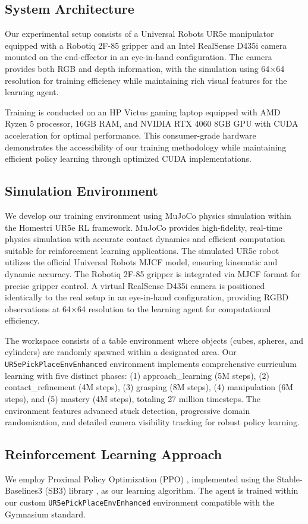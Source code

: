 \documentclass[conference]{IEEEtran}
\begin{document}
\subsection{System Architecture}
Our experimental setup consists of a Universal Robots UR5e manipulator equipped with a Robotiq 2F-85 gripper and an Intel RealSense D435i camera mounted on the end-effector in an eye-in-hand configuration. The camera provides both RGB and depth information, with the simulation using 64$\times$64 resolution for training efficiency while maintaining rich visual features for the learning agent. 

Training is conducted on an HP Victus gaming laptop equipped with AMD Ryzen 5 processor, 16GB RAM, and NVIDIA RTX 4060 8GB GPU with CUDA acceleration for optimal performance. This consumer-grade hardware demonstrates the accessibility of our training methodology while maintaining efficient policy learning through optimized CUDA implementations.

\subsection{Simulation Environment}
We develop our training environment using MuJoCo physics simulation within the Homestri UR5e RL framework. MuJoCo provides high-fidelity, real-time physics simulation with accurate contact dynamics and efficient computation suitable for reinforcement learning applications. The simulated UR5e robot utilizes the official Universal Robots MJCF model, ensuring kinematic and dynamic accuracy. The Robotiq 2F-85 gripper is integrated via MJCF format for precise gripper control. A virtual RealSense D435i camera is positioned identically to the real setup in an eye-in-hand configuration, providing RGBD observations at 64$\times$64 resolution to the learning agent for computational efficiency.

The workspace consists of a table environment where objects (cubes, spheres, and cylinders) are randomly spawned within a designated area. Our \texttt{UR5ePickPlaceEnvEnhanced} environment implements comprehensive curriculum learning with five distinct phases: (1) approach\_learning (5M steps), (2) contact\_refinement (4M steps), (3) grasping (8M steps), (4) manipulation (6M steps), and (5) mastery (4M steps), totaling 27 million timesteps. The environment features advanced stuck detection, progressive domain randomization, and detailed camera visibility tracking for robust policy learning.

\subsection{Reinforcement Learning Approach}
We employ Proximal Policy Optimization (PPO) \cite{schulman2017proximal}, implemented using the Stable-Baselines3 (SB3) library \cite{raffin2021stable}, as our learning algorithm. The agent is trained within our custom \texttt{UR5ePickPlaceEnvEnhanced} environment compatible with the Gymnasium standard.
\end{document}
